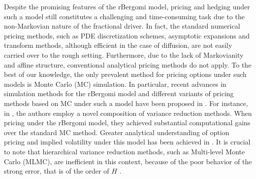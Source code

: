 Despite the promising features of the rBergomi model, pricing  and hedging under such a model still constitutes a challenging and time-consuming task due  to the non-Markovian nature of the fractional driver.  In fact, the standard numerical pricing methods, such as PDE discretization schemes, asymptotic expansions and transform
methods, although efficient in the case of diffusion, are not easily  carried over to the rough setting. Furthermore,  due to the lack of Markovianity and affine structure, conventional analytical pricing methods  do not apply. To the best of our knowledge, the only prevalent method for pricing  options under such models is Monte Carlo (MC) simulation. In particular,  recent advances in simulation methods for the rBergomi model and different variants of pricing methods based on  MC under such a model   have been proposed in \cite{bayer2016pricing,bayer2017regularity,bennedsen2017hybrid,mccrickerd2018turbocharging,jacquier2018vix}.  For instance, in \cite{mccrickerd2018turbocharging}, the authors employ a novel composition of variance reduction methods. When pricing under the rBergomi model, they achieved substantial computational gains  over the standard MC method.  Greater  analytical understanding of option pricing and implied volatility under this model has been achieved  in \cite{jacquier2017pathwise,forde2017asymptotics,bayer2018short}.  It is crucial to note that hierarchical variance reduction methods, such
as Multi-level Monte Carlo (MLMC), are inefficient in this context, because of the poor behavior of the strong error, that is of the order of $H$ \cite{neuenkirch2016order}.

